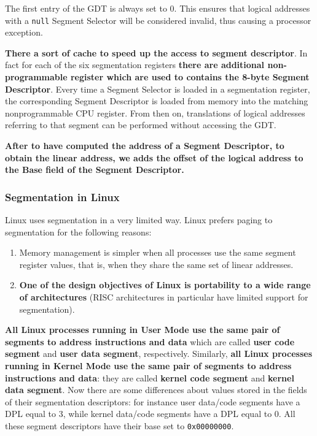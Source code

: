 \documentclass[10pt,a4paper]{article}
\begin{document}
The first entry of the GDT is always set to 0. This ensures that logical addresses with a \texttt{null} Segment Selector will be considered invalid, thus causing a processor exception. 

\textbf{There a sort of cache to speed up the access to segment descriptor}. In fact for each of the six segmentation registers \textbf{there are additional non-programmable register which are used to contains the 8-byte Segment Descriptor}.  Every time a Segment Selector is loaded in a segmentation register, the corresponding Segment Descriptor is loaded from memory into the matching nonprogrammable CPU register. From then on, translations of logical addresses referring to that segment can be performed without accessing the GDT.

\textbf{After to have computed the address of a Segment Descriptor, to obtain the linear address, we adds the offset of the logical address to the Base field of the Segment Descriptor.}

\subsubsection{Segmentation in Linux}

Linux uses segmentation in a very limited way. Linux prefers paging to segmentation for the following reasons:
\begin{enumerate}
\item Memory management is simpler when all processes use the same segment register values, that is, when they share the same set of linear addresses.
\item \textbf{One of the design objectives of Linux is portability to a wide range of architectures} (RISC architectures in particular have limited support for segmentation).
\end{enumerate}



 \textbf{All Linux processes running in User Mode use the same pair of segments to address instructions and data} which are called \textbf{user code segment} and \textbf{user data segment}, respectively. Similarly, \textbf{all Linux processes running in Kernel Mode use the same pair of segments to address instructions and data}: they are called \textbf{kernel code segment} and \textbf{kernel data segment}. Now there are some differences about values stored in the fields of their segmentation descriptors: for instance user data/code segments have a DPL equal to 3, while kernel data/code segments have a DPL equal to 0. All these segment descriptors have their base set to \texttt{0x00000000}. 
\end{document}
